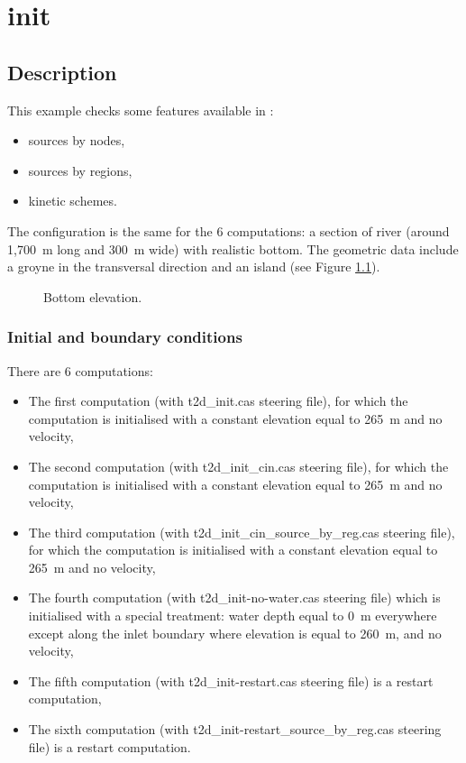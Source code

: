 \chapter{init}

\section{Description}

This example checks some features available in :
\begin{itemize}
\item sources by nodes,
\item sources by regions,
\item kinetic schemes.
\end{itemize}

The configuration is the same for the 6 computations:
a section of river (around 1,700~m long and 300~m wide)
with realistic bottom.
The geometric data include a groyne in the transversal direction and an island
(see Figure \ref{t2d:init:fig:bottom}).

\begin{figure}[!htbp]
 \centering
 \caption{Bottom elevation.}
 \label{t2d:init:fig:bottom}
\end{figure}

\subsection{Initial and boundary conditions}

There are 6 computations:
\begin{itemize}
\item The first computation (with t2d\_init.cas steering file), for which
the computation is initialised with a constant elevation equal to 265~m and no
velocity,

\item The second computation (with t2d\_init\_cin.cas steering file), for which
the computation is initialised with a constant elevation equal to 265~m and no
velocity,

\item The third computation (with t2d\_init\_cin\_source\_by\_reg.cas steering
file), for which the computation is initialised with a constant elevation equal
to 265~m and no velocity,

\item The fourth computation (with t2d\_init-no-water.cas steering file) which
is initialised with a special treatment: water depth equal to 0~m everywhere
except along the inlet boundary where elevation is equal to 260~m, and no velocity,

\item The fifth computation (with t2d\_init-restart.cas steering file) is a restart
computation,

\item The sixth computation (with t2d\_init-restart\_source\_by\_reg.cas steering file)
is a restart computation.

\end{itemize}

